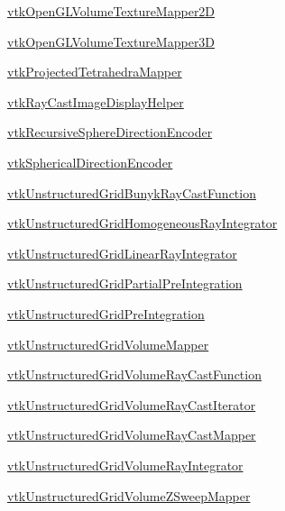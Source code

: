 \begin{DoxyItemize}
\item \hyperlink{vtkvolumerendering_vtkopenglvolumetexturemapper2d}{vtk\-Open\-G\-L\-Volume\-Texture\-Mapper2\-D}  
\item \hyperlink{vtkvolumerendering_vtkopenglvolumetexturemapper3d}{vtk\-Open\-G\-L\-Volume\-Texture\-Mapper3\-D}  
\item \hyperlink{vtkvolumerendering_vtkprojectedtetrahedramapper}{vtk\-Projected\-Tetrahedra\-Mapper}  
\item \hyperlink{vtkvolumerendering_vtkraycastimagedisplayhelper}{vtk\-Ray\-Cast\-Image\-Display\-Helper}  
\item \hyperlink{vtkvolumerendering_vtkrecursivespheredirectionencoder}{vtk\-Recursive\-Sphere\-Direction\-Encoder}  
\item \hyperlink{vtkvolumerendering_vtksphericaldirectionencoder}{vtk\-Spherical\-Direction\-Encoder}  
\item \hyperlink{vtkvolumerendering_vtkunstructuredgridbunykraycastfunction}{vtk\-Unstructured\-Grid\-Bunyk\-Ray\-Cast\-Function}  
\item \hyperlink{vtkvolumerendering_vtkunstructuredgridhomogeneousrayintegrator}{vtk\-Unstructured\-Grid\-Homogeneous\-Ray\-Integrator}  
\item \hyperlink{vtkvolumerendering_vtkunstructuredgridlinearrayintegrator}{vtk\-Unstructured\-Grid\-Linear\-Ray\-Integrator}  
\item \hyperlink{vtkvolumerendering_vtkunstructuredgridpartialpreintegration}{vtk\-Unstructured\-Grid\-Partial\-Pre\-Integration}  
\item \hyperlink{vtkvolumerendering_vtkunstructuredgridpreintegration}{vtk\-Unstructured\-Grid\-Pre\-Integration}  
\item \hyperlink{vtkvolumerendering_vtkunstructuredgridvolumemapper}{vtk\-Unstructured\-Grid\-Volume\-Mapper}  
\item \hyperlink{vtkvolumerendering_vtkunstructuredgridvolumeraycastfunction}{vtk\-Unstructured\-Grid\-Volume\-Ray\-Cast\-Function}  
\item \hyperlink{vtkvolumerendering_vtkunstructuredgridvolumeraycastiterator}{vtk\-Unstructured\-Grid\-Volume\-Ray\-Cast\-Iterator}  
\item \hyperlink{vtkvolumerendering_vtkunstructuredgridvolumeraycastmapper}{vtk\-Unstructured\-Grid\-Volume\-Ray\-Cast\-Mapper}  
\item \hyperlink{vtkvolumerendering_vtkunstructuredgridvolumerayintegrator}{vtk\-Unstructured\-Grid\-Volume\-Ray\-Integrator}  
\item \hyperlink{vtkvolumerendering_vtkunstructuredgridvolumezsweepmapper}{vtk\-Unstructured\-Grid\-Volume\-Z\-Sweep\-Mapper}  

\end{DoxyItemize}
